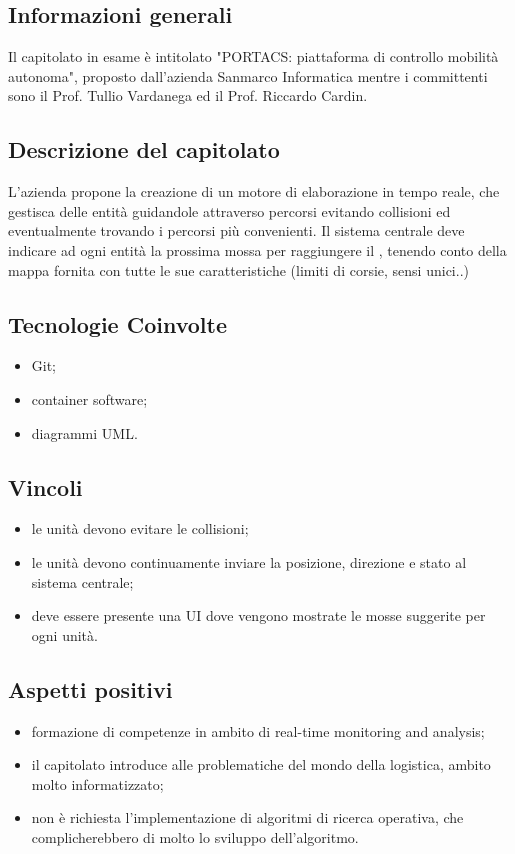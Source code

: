 \subsection{Informazioni generali}
Il capitolato in esame è intitolato "PORTACS: piattaforma di controllo mobilità autonoma", proposto dall'azienda Sanmarco Informatica mentre i committenti sono il Prof. Tullio Vardanega ed il Prof. Riccardo Cardin.
\subsection{Descrizione del capitolato}
L'azienda propone la creazione di un motore di elaborazione in tempo reale, che gestisca delle entità guidandole attraverso percorsi evitando collisioni ed eventualmente trovando i percorsi più convenienti.
Il sistema centrale deve indicare ad ogni entità la prossima mossa per raggiungere il , tenendo conto della mappa fornita con tutte le sue caratteristiche (limiti di corsie, sensi unici..)
\subsection{Tecnologie Coinvolte}
\begin{itemize}
    \item Git;
    \item container software;
    \item diagrammi UML.
\end{itemize}
\subsection{Vincoli}
\begin{itemize}
    \item le unità devono evitare le collisioni;
    \item le unità devono continuamente inviare la posizione, direzione e stato al sistema centrale;
    \item deve essere presente una UI dove vengono mostrate le mosse suggerite per ogni unità.
\end{itemize}
\subsection{Aspetti positivi}
\begin{itemize}
    \item formazione di competenze in ambito di real-time monitoring and analysis;
    \item il capitolato introduce alle problematiche del mondo della logistica, ambito molto informatizzato;
    \item non è richiesta l'implementazione di algoritmi di ricerca operativa, che complicherebbero di molto lo sviluppo dell'algoritmo.
\end{itemize}
